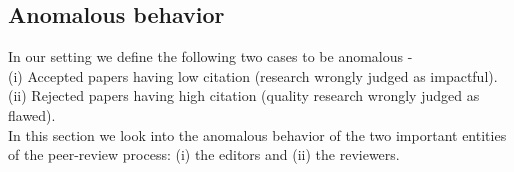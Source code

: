 \noindent
\subsection{Anomalous behavior}
\label{anomalies}
 In our setting we define the following two cases to be anomalous - \\
(i) Accepted papers having low citation (research wrongly judged as impactful). \\
(ii) Rejected papers having high citation (quality research wrongly judged as flawed). \\
In this section we look into the anomalous behavior of the two important entities of the peer-review process: (i) the editors and (ii) the reviewers.